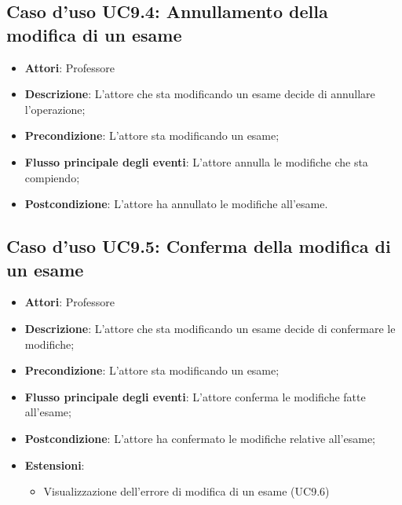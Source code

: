 \subsection{Caso d'uso \texorpdfstring{UC9.4}{UC9.4}: Annullamento della modifica di un esame}
\begin{itemize}
\item \textbf{Attori}: Professore
\item \textbf{Descrizione}: L'attore che sta modificando un esame decide di annullare l'operazione;
\item \textbf{Precondizione}: L'attore sta modificando un esame;
\item \textbf{Flusso principale degli eventi}: L'attore annulla le modifiche che sta compiendo;
\item \textbf{Postcondizione}: L'attore ha annullato le modifiche all'esame.
\end{itemize}
\subsection{Caso d'uso \texorpdfstring{UC9.5}{UC9.5}: Conferma della modifica di un esame}
\begin{itemize}
\item \textbf{Attori}: Professore
\item \textbf{Descrizione}: L'attore che sta modificando un esame decide di confermare le modifiche;
\item \textbf{Precondizione}: L'attore sta modificando un esame;
\item \textbf{Flusso principale degli eventi}: L'attore conferma le modifiche fatte all'esame;
\item \textbf{Postcondizione}: L'attore ha confermato le modifiche relative all'esame;
\item \textbf{Estensioni}:
\begin{itemize}
\item Visualizzazione dell'errore di modifica di un esame (UC9.6)
\end{itemize}
\end{itemize}

